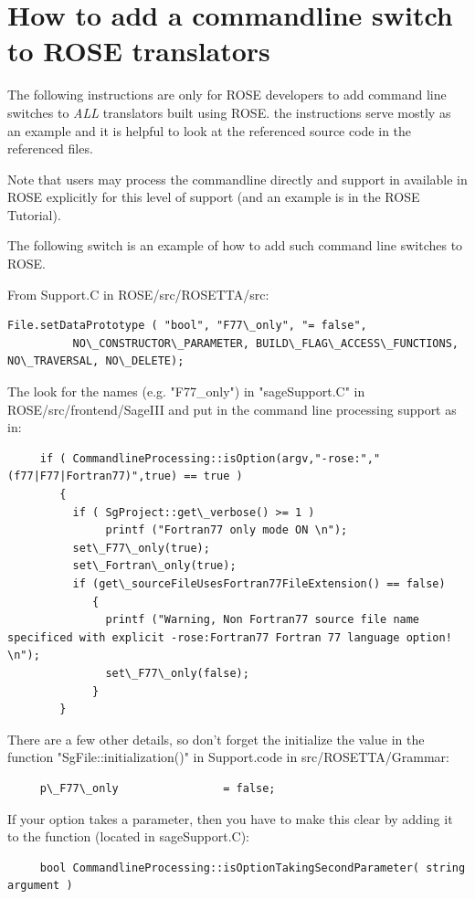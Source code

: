 \newpage

\section{How to add a commandline switch to ROSE translators}
   The following instructions are only for ROSE developers to add 
command line switches to {\em ALL} translators built using ROSE.
the instructions serve mostly as an example and it is helpful to look
at the referenced source code in the referenced files.

Note that users may process the commandline directly and support in
available in ROSE explicitly for this level of support (and an example is
in the ROSE Tutorial).

The following switch is an example of how to add such command line switches to ROSE.

From Support.C in ROSE/src/ROSETTA/src:
{
\indent
\begin{verbatim}
File.setDataPrototype ( "bool", "F77\_only", "= false",
          NO\_CONSTRUCTOR\_PARAMETER, BUILD\_FLAG\_ACCESS\_FUNCTIONS, NO\_TRAVERSAL, NO\_DELETE);
\end{verbatim} 
}

The look for the names (e.g. "F77\_only") in "sageSupport.C" in ROSE/src/frontend/SageIII
and put in the command line processing support as in:
{
\indent
\begin{verbatim}
     if ( CommandlineProcessing::isOption(argv,"-rose:","(f77|F77|Fortran77)",true) == true )
        {
          if ( SgProject::get\_verbose() >= 1 )
               printf ("Fortran77 only mode ON \n");
          set\_F77\_only(true);
          set\_Fortran\_only(true);
          if (get\_sourceFileUsesFortran77FileExtension() == false)
             {
               printf ("Warning, Non Fortran77 source file name specificed with explicit -rose:Fortran77 Fortran 77 language option! \n");
               set\_F77\_only(false);
             }
        }
\end{verbatim} 
}

There are a few other details, so don't forget the initialize
the value in the function "SgFile::initialization()" in Support.code
in src/ROSETTA/Grammar:
{
\indent
\begin{verbatim}
     p\_F77\_only                = false;
\end{verbatim} 
}

If your option takes a parameter, then you have to make this clear by adding it to the
function (located in sageSupport.C):
{
\indent
\begin{verbatim}
     bool CommandlineProcessing::isOptionTakingSecondParameter( string argument )
\end{verbatim} 
}

